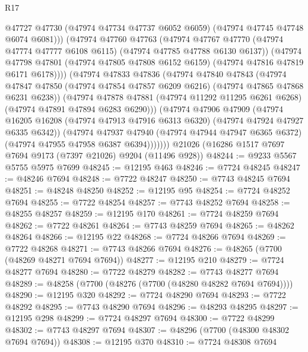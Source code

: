 \begin{lexlean}{R17}
\begin{coremodule}
                @47727
                @47730
                (@47974 @47734 @47737 @6052 @6059)
                (@47974 @47745 @47748 @6074 @6081)))
            (@47974
              @47760
              @47763
              (@47974
                @47767
                @47770
                (@47974 @47774 @47777 @6108 @6115)
                (@47974 @47785 @47788 @6130 @6137))
              (@47974
                @47798
                @47801
                (@47974 @47805 @47808 @6152 @6159)
                (@47974 @47816 @47819 @6171 @6178))))
          (@47974
            @47833
            @47836
            (@47974
              @47840
              @47843
              (@47974
                @47847
                @47850
                (@47974 @47854 @47857 @6209 @6216)
                (@47974 @47865 @47868 @6231 @6238))
              (@47974
                @47878
                @47881
                (@47974 @11292 @11295 @6261 @6268)
                (@47974 @47891 @47894 @6283 @6290)))
            (@47974
              @47906
              @47909
              (@47974
                @16205
                @16208
                (@47974 @47913 @47916 @6313 @6320)
                (@47974 @47924 @47927 @6335 @6342))
              (@47974
                @47937
                @47940
                (@47974 @47944 @47947 @6365 @6372)
                (@47974 @47955 @47958 @6387 @6394)))))))
    @21026
    (@16286 @1517 @7697 @7694 @9173 (@7397 @21026) @9204 (@11496 @928))
@48244 := @9233 @5567 @5755 @5975 @7699
@48245 := @12195 @463
@48246 := @7724 @48245
@48247 := @48246 @7694
@48248 := @7722 @48247
@48250 := @7743 @48245 @7694
@48251 := @48248 @48250
@48252 := @12195 @95
@48254 := @7724 @48252 @7694
@48255 := @7722 @48254
@48257 := @7743 @48252 @7694
@48258 := @48255 @48257
@48259 := @12195 @170
@48261 := @7724 @48259 @7694
@48262 := @7722 @48261
@48264 := @7743 @48259 @7694
@48265 := @48262 @48264
@48266 := @12195 @22
@48268 := @7724 @48266 @7694
@48269 := @7722 @48268
@48271 := @7743 @48266 @7694
@48276 := @48265 (@7700 (@48269 @48271 @7694 @7694))
@48277 := @12195 @210
@48279 := @7724 @48277 @7694
@48280 := @7722 @48279
@48282 := @7743 @48277 @7694
@48289 := @48258 (@7700 (@48276 (@7700 (@48280 @48282 @7694 @7694))))
@48290 := @12195 @320
@48292 := @7724 @48290 @7694
@48293 := @7722 @48292
@48295 := @7743 @48290 @7694
@48296 := @48293 @48295
@48297 := @12195 @298
@48299 := @7724 @48297 @7694
@48300 := @7722 @48299
@48302 := @7743 @48297 @7694
@48307 := @48296 (@7700 (@48300 @48302 @7694 @7694))
@48308 := @12195 @370
@48310 := @7724 @48308 @7694

\end{coremodule}
\end{lexlean}
